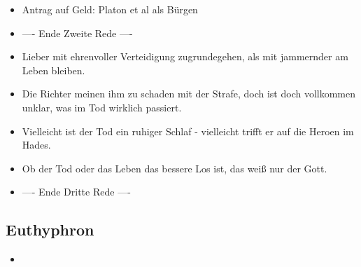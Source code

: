 \documentclass[emulatestandardclasses]{scrartcl}
\begin{document}
\begin{itemize}
  \item Antrag auf Geld: Platon et al als Bürgen
  \item ---- Ende Zweite Rede ----
  \item Lieber mit ehrenvoller Verteidigung zugrundegehen, als mit jammernder am Leben bleiben.
  \item Die Richter meinen ihm zu schaden mit der Strafe, doch ist doch vollkommen unklar, was im Tod wirklich passiert. 
  \item Vielleicht ist der Tod ein ruhiger Schlaf - vielleicht trifft er auf die Heroen im Hades.
  \item Ob der Tod oder das Leben das bessere Los ist, das weiß nur der Gott.
  \item ---- Ende Dritte Rede ----
\end{itemize}

\subsection{Euthyphron}

\begin{itemize}
  \item 
\end{itemize}


\newpage
%


\end{document}
